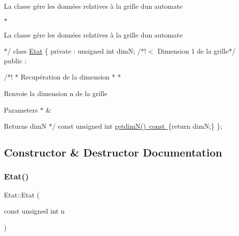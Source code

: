 La classe gére les données relatives à la grille d\textquotesingle{}un automate


\begin{DoxyItemize}
\item $\ast$
\item 
\end{DoxyItemize}

La classe gére les données relatives à la grille d\textquotesingle{}un automate
\begin{DoxyItemize}
\item $\ast$/ class \mbox{\hyperlink{class_etat}{Etat}} \{ private \+: unsigned int dimN; /$\ast$!$<$ Dimension 1 de la grille$\ast$/ public \+: \begin{DoxyVerb}/*!
 * Recupération de la dimension
 *
 * 
\end{DoxyVerb}

\end{DoxyItemize}

Renvoie la dimension n de la grille
\begin{DoxyItemize}
\item 
\item 
\begin{DoxyParams}{Parameters}
{\em $\ast$} & \\
\hline
\end{DoxyParams}
\begin{DoxyReturn}{Returns}
dimN $\ast$/ const unsigned int \mbox{\hyperlink{class_etat_aa30f352f0cd2cc3058a5df552615638c}{getdim\+N() const }}\{return dimN;\} \}; 
\end{DoxyReturn}

\end{DoxyItemize}

\subsection{Constructor \& Destructor Documentation}
\mbox{\label{class_etat_a9b4db6036be6e5a88414e07a6c15751d}} 
\subsubsection{\texorpdfstring{Etat()}{Etat()}}
{\footnotesize\ttfamily Etat\+::\+Etat (\begin{DoxyParamCaption}\item[{const unsigned int}]{n }\end{DoxyParamCaption})\hspace{0.3cm}{\ttfamily [inline]}}



